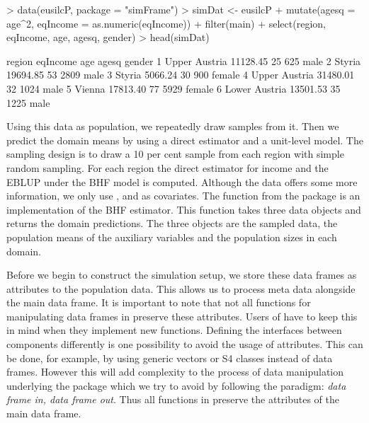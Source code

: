 \documentclass[article]{ajs}
\begin{document}
\begin{Schunk}
\begin{Sinput}
> data(eusilcP, package = "simFrame")
> simDat <- eusilcP %
+   mutate(agesq = age^2, eqIncome = as.numeric(eqIncome)) %
+   filter(main) %
+   select(region, eqIncome, age, agesq, gender)
> head(simDat)
\end{Sinput}
\begin{Soutput}
         region eqIncome age agesq gender
1 Upper Austria 11128.45  25   625   male
2        Styria 19694.85  53  2809   male
3        Styria  5066.24  30   900 female
4 Upper Austria 31480.01  32  1024   male
5        Vienna 17813.40  77  5929 female
6 Lower Austria 13501.53  35  1225   male
\end{Soutput}
\end{Schunk}

Using this data as population, we repeatedly draw samples from it. Then we predict the domain means by using a direct estimator and a unit-level model. The sampling design is to draw a 10 per cent sample from each region with simple random sampling. For each region the direct estimator for income and the EBLUP under the BHF model is computed. Although the data offers some more information, we only use ,  and  as covariates. The function  from the package  is an implementation of the BHF estimator. This function takes three data objects and returns the domain predictions. The three objects are the sampled data, the population means of the auxiliary variables and the population sizes in each domain. 

Before we begin to construct the simulation setup, we store these data frames as attributes to the population data. This allows us to process meta data alongside the main data frame. It is important to note that not all functions for manipulating data frames in  preserve these attributes. Users of  have to keep this in mind when they implement new functions. Defining the interfaces between components differently is one possibility to avoid the usage of attributes. This can be done, for example, by using generic vectors or S4 classes instead of data frames. However this will add complexity to the process of data manipulation underlying the package which we try to avoid by following the paradigm: \textit{data frame in, data frame out}. Thus all functions in  preserve the attributes of the main data frame.
\end{document}

